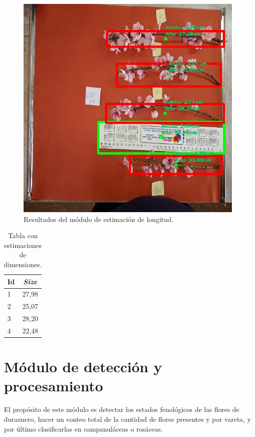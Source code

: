 \begin{figure}[ht]
     \centering
        \includegraphics[scale=0.5]{./Figures/vareta_size.jpeg}
        \caption{Resultados del módulo de estimación de longitud.}
        \label{fig:modulo1}
\end{figure}

\begin{table}[h]
	\centering
	\caption{Tabla con estimaciones de dimensiones.}
	\begin{tabular}{l c}    
		\toprule
		\textbf{Id}     & \textbf{\textit{Size}}\\
		\midrule
		1               &  27,98\\
		2               & 25,07\\
		3               & 28,20 \\
		4               & 22,48 \\	
		\bottomrule
		\hline
	\end{tabular}
	\label{tab:tablaestimaciones01}
\end{table} 
\newpage

\section{Módulo de detección y procesamiento}

El propósito de este módulo es detectar los estados fenológicos de las flores de duraznero, hacer un conteo total de la cantidad de flores presentes y por vareta, y por último clasificarlas en campanuláceas o rosáceas.

